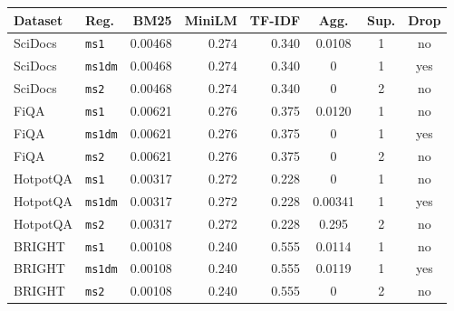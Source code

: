 \begin{supplementtable}
  \caption{Retention-matched thresholds for the primary protocol
    (\texttt{primary\_minmax\_retention\_matched}). Vote thresholds are
    shared across regimes within a dataset; aggregate thresholds and
    drop-mutual flags are regime-specific. Matching target: raw-margin
    retained-vote rates (per ranker) and raw retained edge count (per
    regime). Calibration: unsupervised collection-level protocol thresholds
    on the same usable queries later evaluated; qrels/nDCG are not used
    (transductive query list; the main internal-validity discussion).
    Regime abbreviations: \texttt{ms1},
    \texttt{ms1dm}=\texttt{ms1\_drop\_mutual}, \texttt{ms2}.}
  \label{tab:thresholds}
  \sncstable
  \begin{tabular}{@{}llrrrccc@{}}
    \toprule
    Dataset & Reg. & BM25 & MiniLM & TF-IDF & Agg. & Sup. & Drop \\
    \midrule
    SciDocs & \texttt{ms1} & 0.00468 & 0.274 & 0.340 & 0.0108 & 1 & no \\
    \addlinespace
    SciDocs & \texttt{ms1dm} & 0.00468 & 0.274 & 0.340 & 0 & 1 & yes \\
    \addlinespace
    SciDocs & \texttt{ms2} & 0.00468 & 0.274 & 0.340 & 0 & 2 & no \\
    \addlinespace
    FiQA & \texttt{ms1} & 0.00621 & 0.276 & 0.375 & 0.0120 & 1 & no \\
    \addlinespace
    FiQA & \texttt{ms1dm} & 0.00621 & 0.276 & 0.375 & 0 & 1 & yes \\
    \addlinespace
    FiQA & \texttt{ms2} & 0.00621 & 0.276 & 0.375 & 0 & 2 & no \\
    \addlinespace
    HotpotQA & \texttt{ms1} & 0.00317 & 0.272 & 0.228 & 0 & 1 & no \\
    \addlinespace
    HotpotQA & \texttt{ms1dm} & 0.00317 & 0.272 & 0.228 & 0.00341 & 1 & yes \\
    \addlinespace
    HotpotQA & \texttt{ms2} & 0.00317 & 0.272 & 0.228 & 0.295 & 2 & no \\
    \addlinespace
    BRIGHT & \texttt{ms1} & 0.00108 & 0.240 & 0.555 & 0.0114 & 1 & no \\
    \addlinespace
    BRIGHT & \texttt{ms1dm} & 0.00108 & 0.240 & 0.555 & 0.0119 & 1 & yes \\
    \addlinespace
    BRIGHT & \texttt{ms2} & 0.00108 & 0.240 & 0.555 & 0 & 2 & no \\
    \bottomrule
  \end{tabular}
\end{supplementtable}